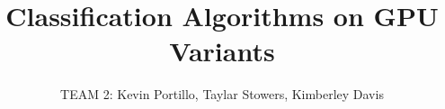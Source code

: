 \documentclass[11pt]{article}
\begin{document}
\title{Classification Algorithms on GPU Variants}
\author{TEAM 2: Kevin Portillo, Taylar Stowers, Kimberley Davis}
\maketitle




\end{document}
